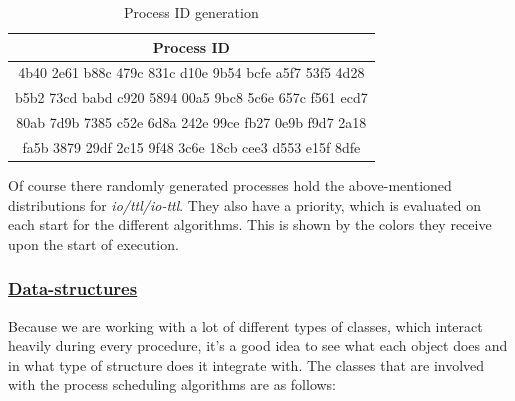\documentclass{article}
\begin{document}
\begin{table}[H]
  \begin{center}
    \label{tab:Process ID generation}
    \begin{tabular}{|c|}
      \toprule
       \textbf{Process ID} \\
      \midrule
      4b40 2e61 b88c 479c 831c d10e 9b54 bcfe a5f7 53f5 4d28 \\
      b5b2 73cd babd c920 5894 00a5 9bc8 5c6e 657c f561 ecd7 \\
      80ab 7d9b 7385 c52e 6d8a 242e 99ce fb27 0e9b f9d7 2a18 \\
      fa5b 3879 29df 2c15 9f48 3c6e 18cb cee3 d553 e15f 8dfe \\
      \bottomrule
    \end{tabular}
    \caption{Process ID generation}
  \end{center}
\end{table}

Of course there randomly generated processes hold the above-mentioned distributions for \textit{io/ttl/io-ttl}. They also have a priority, which is evaluated on each start for the different algorithms. This is shown by the colors they receive upon the start of execution.

\subsubsection{\underline{Data-structures}}

Because we are working with a lot of different types of classes, which interact heavily during every procedure, it's a good idea to see what each object does and in what type of structure does it integrate with. The classes that are involved with the process scheduling algorithms are as follows:
\end{document}
